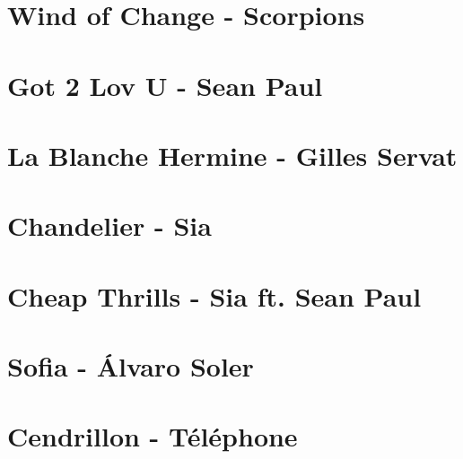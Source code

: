 \documentclass{guitartabs}
\begin{document}
\section*{Wind of Change - Scorpions}
\begin{guitar}

\end{guitar}

\section{Got 2 Lov U - Sean Paul}
\begin{guitar}

\end{guitar}



\section{La Blanche Hermine - Gilles Servat}
\begin{guitar}

\end{guitar}

\section{Chandelier - Sia}
\begin{guitar}

\end{guitar}

\section{Cheap Thrills - Sia ft. Sean Paul}
\begin{guitar}

\end{guitar}


\section{Sofia - Álvaro Soler}
\begin{guitar}

\end{guitar}

\section*{Cendrillon - Téléphone}
\begin{guitar}

\end{guitar}
\end{document}
